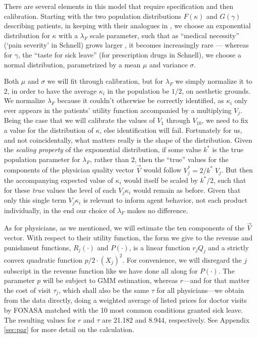 \documentclass[../main.tex]{subfiles}
\begin{document}
There are several elements in this model that require specification and then calibration. Starting with the two population distributions $F(\kappa)$ and $G(\gamma)$ describing patients, in keeping with their analogues in \cite{schnell2017physician}, we choose an exponential distribution for $\kappa$ with a $\lambda_F$ scale parameter, such that as ``medical necessity'' (`pain severity' in Schnell) grows larger , it becomes increasingly rare — whereas for $\gamma$, the ``taste for sick leave'' (for prescription drugs in Schnell), we choose a normal distribution, parametrized by a mean $\mu$ and variance $\sigma$.

Both $\mu$ and $\sigma$ we will fit through calibration, but for $\lambda_F$ we simply normalize it to 2, in order to have the average $\kappa_i$ in the population be $1/2$, on aesthetic grounds. We normalize $\lambda_F$ because it couldn't otherwise be correctly identified, as $\kappa_i$ only ever appears in the patients' utility function accompanied by a multiplying $V_j$. Being the case that we will calibrate the values of $V_1$ through $V_{10}$, we need to fix a value for the distribution of $\kappa$, else identification will fail. Fortunately for us, and not coincidentally, what matters really is the shape of the distribution. Given the \textit{scaling property} of the exponential distribution, if some value $k^*$ is the true population parameter for $\lambda_F$, rather than 2, then the ``true'' values for the components of the physician quality vector $\vec{V}$ would follow $V_j^* = 2/k^* \; V_j$. But then the accompanying expected value of $\kappa_i$ would itself be scaled by $k^*/2$, such that for these \textit{true} values the level of each $V_j \kappa_i$ would remain as before. Given that only this single term $V_j \kappa_i$ is relevant to inform agent behavior, not each product individually, in the end our choice of $\lambda_F$ makes no difference.

As for physicians, as we mentioned, we will estimate the ten components of the $\vec{V}$ vector. With respect to their utility function, the form we give to the revenue and punishment functions, $R_j(\cdot)$ and $P(\cdot)$, is a linear function $r_j Q_j$ and a strictly convex quadratic function $p / 2 \cdot (X_j)^2$. For convenience, we will disregard the $j$ subscript in the revenue function like we have done all along for $P(\cdot)$. The parameter $p$ will be subject to GMM estimation, whereas $r$—and for that matter the cost of visit $\tau_j$, which shall also be the same $\tau$ for all physicians—we obtain from the data directly, doing a weighted average of listed prices for doctor visits by FONASA matched with the 10 most common conditions granted sick leave. The resulting values for $r$ and $\tau$ are 21.182 and 8.944, respectively. See Appendix \ref{sec:par} for more detail on the calculation.
\end{document}
